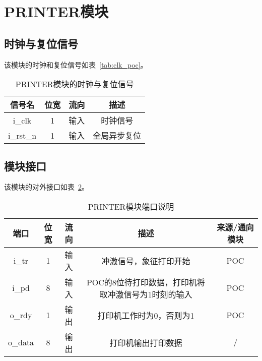\documentclass[lang=cn,a4paper,newtx]{elegantpaper}
\begin{document}
\section{PRINTER模块}
\subsection{时钟与复位信号}
该模块的时钟和复位信号如表~\ref{tab:clk_poc}。
\begin{table}[htbp]
    \centering
    \renewcommand{\arraystretch}{1.2} %
    \begin{tabular}{c c c c}
        \toprule
        信号名 & 位宽 & 流向 & 描述 \\
        \midrule
        i\_clk   & 1 & 输入 & 时钟信号\\
        i\_rst\_n & 1 & 输入 & 全局异步复位\\
        \bottomrule
    \end{tabular}
    \caption{PRINTER模块的时钟与复位信号}
    \label{tab:clk_printer}
\end{table}
\subsection{模块接口}
该模块的对外接口如表~\ref{tab:port_description_printer}。
\begin{table}[htbp]
    \centering
    \renewcommand{\arraystretch}{1.2} %
    \begin{tabular}{c c c c c}
        \toprule
        端口 & 位宽 & 流向 & 描述 & 来源/通向模块 \\
        \midrule
        i\_tr  & 1 & 输入 & 冲激信号，象征打印开始 & POC \\ 
        i\_pd  & 8 & 输入 & POC的8位待打印数据，打印机将取冲激信号为1时刻的输入 & POC \\
        o\_rdy   & 1 & 输出 & 打印机工作时为0，否则为1 & POC\\
        o\_data    & 8 & 输出 & 打印机输出打印数据 & / \\
        \bottomrule
    \end{tabular}
    \caption{PRINTER模块端口说明}
    \label{tab:port_description_printer}
\end{table}
\end{document}
